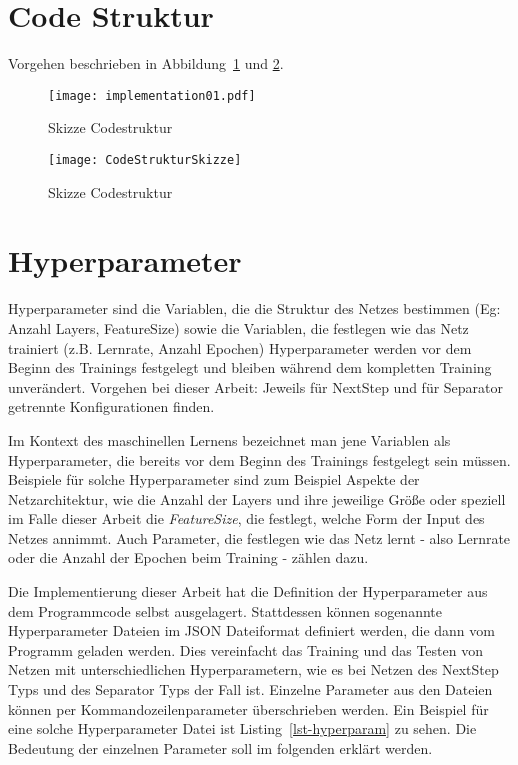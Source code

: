 
\section{Code Struktur}

Vorgehen beschrieben in Abbildung~\ref{fig:impl01} und \ref{CodeStruktur}.

\begin{figure}[h]
    \centering
    \texttt{[image: implementation01.pdf]}
    \caption{Skizze Codestruktur}
    \label{fig:impl01}
\end{figure}


\begin{figure}[h]
    \centering
    \texttt{[image: CodeStrukturSkizze]}
    \caption{Skizze Codestruktur}
    \label{CodeStruktur}
\end{figure}
  

\section{Hyperparameter}

\color{blue}
Hyperparameter sind die Variablen, die die Struktur des Netzes bestimmen (Eg: Anzahl Layers, FeatureSize) 
sowie die Variablen, die festlegen wie das Netz trainiert (z.B. Lernrate, Anzahl Epochen)
Hyperparameter werden vor dem Beginn des Trainings festgelegt und bleiben während dem kompletten Training unverändert.
Vorgehen bei dieser Arbeit: Jeweils für NextStep und für Separator getrennte Konfigurationen finden.
\color{black}

Im Kontext des maschinellen Lernens bezeichnet man jene Variablen als Hyperparameter, 
die bereits vor dem Beginn des Trainings festgelegt sein müssen.
Beispiele für solche Hyperparameter sind zum Beispiel Aspekte der Netzarchitektur, wie die Anzahl der Layers und ihre jeweilige Größe 
oder speziell im Falle dieser Arbeit die \textit{FeatureSize}, die festlegt, welche Form der Input des Netzes annimmt.
Auch Parameter, die festlegen wie das Netz lernt - also Lernrate oder die Anzahl der Epochen beim Training - zählen dazu.

Die Implementierung dieser Arbeit hat die Definition der Hyperparameter aus dem Programmcode selbst ausgelagert.
Stattdessen können sogenannte Hyperparameter Dateien im JSON Dateiformat definiert werden, die dann vom Programm geladen werden.
Dies vereinfacht das Training und das Testen von Netzen mit unterschiedlichen Hyperparametern, 
wie es bei Netzen des NextStep Typs und des Separator Typs der Fall ist.
Einzelne Parameter aus den Dateien können per Kommandozeilenparameter überschrieben werden.
Ein Beispiel für eine solche Hyperparameter Datei ist Listing~\ref{lst-hyperparam} zu sehen.
Die Bedeutung der einzelnen Parameter soll im folgenden erklärt werden.


